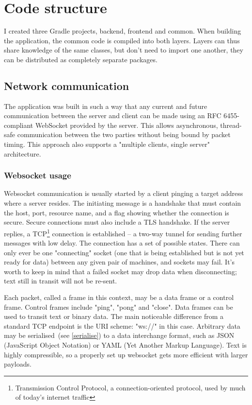 \chapter{Code structure}

I created three Gradle projects, backend, frontend and common. When building the application, the common code is compiled into both layers. Layers can thus share knowledge of the same classes, but don't need to import one another, they can be distributed as completely separate packages.

\section{Network communication}
The application was built in such a way that any current and future communication between the server and client can be made using an RFC 6455-compliant\cite{RFC6455} WebSocket provided by the server. This allows asynchronous, thread-safe communication between the two parties without being bound by packet timing. This approach also supports a "multiple clients, single server" architecture.

\subsection{Websocket usage}
Websocket communication is usually started by a client pinging a target address where a server resides. The initiating message is a handshake that must contain the host, port, resource name, and a flag showing whether the connection is secure. Secure connections must also include a TLS handshake. If the server replies, a TCP\footnote{Transmission Control Protocol, a connection-oriented protocol, used by much of today's internet traffic} connection is established -- a two-way tunnel for sending further messages with low delay. The connection has a set of possible states. There can only ever be one "connecting" socket (one that is being established but is not yet ready for data) between any given pair of machines, and sockets may fail. It's worth to keep in mind that a failed socket may drop data when disconnecting; text still in transit will not be re-sent.

Each packet, called a frame in this context, may be a data frame or a control frame. Control frames include "ping", "pong" and "close". Data frames can be used to transit text or binary data. The main noticeable difference from a standard TCP endpoint is the URI scheme: "ws://" in this case. Arbitrary data may be serialised~(see \ref{serialise}) to a data interchange format, such as JSON (JavaScript Object Notation) or YAML (Yet Another Markup Language). Text is highly compressible, so a properly set up websocket gets more efficient with larger payloads.

